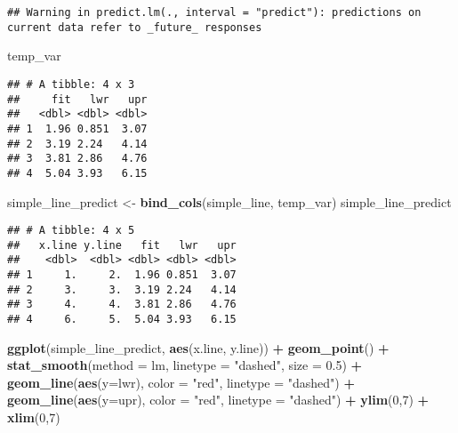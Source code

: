 \documentclass[]{book}
\newenvironment{Shaded}{\begin{snugshade}}{\end{snugshade}}
\newcommand{\DataTypeTok}[1]{\textcolor[rgb]{0.13,0.29,0.53}{#1}}
\newcommand{\DecValTok}[1]{\textcolor[rgb]{0.00,0.00,0.81}{#1}}
\newcommand{\FloatTok}[1]{\textcolor[rgb]{0.00,0.00,0.81}{#1}}
\newcommand{\KeywordTok}[1]{\textcolor[rgb]{0.13,0.29,0.53}{\textbf{#1}}}
\newcommand{\NormalTok}[1]{#1}
\newcommand{\OperatorTok}[1]{\textcolor[rgb]{0.81,0.36,0.00}{\textbf{#1}}}
\newcommand{\StringTok}[1]{\textcolor[rgb]{0.31,0.60,0.02}{#1}}
\theoremstyle{definition}
\theoremstyle{definition}
\theoremstyle{definition}
\theoremstyle{remark}
\begin{document}
\begin{verbatim}
## Warning in predict.lm(., interval = "predict"): predictions on current data refer to _future_ responses
\end{verbatim}

\begin{Shaded}
\begin{Highlighting}[]
\NormalTok{temp_var}
\end{Highlighting}
\end{Shaded}

\begin{verbatim}
## # A tibble: 4 x 3
##     fit   lwr   upr
##   <dbl> <dbl> <dbl>
## 1  1.96 0.851  3.07
## 2  3.19 2.24   4.14
## 3  3.81 2.86   4.76
## 4  5.04 3.93   6.15
\end{verbatim}

\begin{Shaded}
\begin{Highlighting}[]
\NormalTok{simple_line_predict <-}\StringTok{ }\KeywordTok{bind_cols}\NormalTok{(simple_line, temp_var)}
\NormalTok{simple_line_predict}
\end{Highlighting}
\end{Shaded}

\begin{verbatim}
## # A tibble: 4 x 5
##   x.line y.line   fit   lwr   upr
##    <dbl>  <dbl> <dbl> <dbl> <dbl>
## 1     1.     2.  1.96 0.851  3.07
## 2     3.     3.  3.19 2.24   4.14
## 3     4.     4.  3.81 2.86   4.76
## 4     6.     5.  5.04 3.93   6.15
\end{verbatim}

\begin{Shaded}
\begin{Highlighting}[]
\KeywordTok{ggplot}\NormalTok{(simple_line_predict, }\KeywordTok{aes}\NormalTok{(x.line, y.line)) }\OperatorTok{+}
\StringTok{  }\KeywordTok{geom_point}\NormalTok{() }\OperatorTok{+}
\StringTok{  }\KeywordTok{stat_smooth}\NormalTok{(}\DataTypeTok{method =}\NormalTok{ lm, }\DataTypeTok{linetype =} \StringTok{"dashed"}\NormalTok{, }\DataTypeTok{size =} \FloatTok{0.5}\NormalTok{) }\OperatorTok{+}
\StringTok{  }\KeywordTok{geom_line}\NormalTok{(}\KeywordTok{aes}\NormalTok{(}\DataTypeTok{y=}\NormalTok{lwr), }\DataTypeTok{color =} \StringTok{"red"}\NormalTok{, }\DataTypeTok{linetype =} \StringTok{"dashed"}\NormalTok{) }\OperatorTok{+}
\StringTok{  }\KeywordTok{geom_line}\NormalTok{(}\KeywordTok{aes}\NormalTok{(}\DataTypeTok{y=}\NormalTok{upr), }\DataTypeTok{color =} \StringTok{"red"}\NormalTok{, }\DataTypeTok{linetype =} \StringTok{"dashed"}\NormalTok{) }\OperatorTok{+}
\StringTok{  }\KeywordTok{ylim}\NormalTok{(}\DecValTok{0}\NormalTok{,}\DecValTok{7}\NormalTok{) }\OperatorTok{+}
\StringTok{  }\KeywordTok{xlim}\NormalTok{(}\DecValTok{0}\NormalTok{,}\DecValTok{7}\NormalTok{)}
\end{Highlighting}
\end{Shaded}
\end{document}
